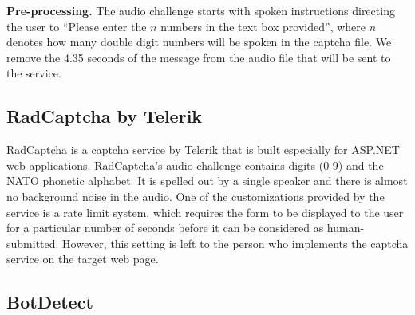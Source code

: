 
\textbf{Pre-processing.} The audio challenge starts with spoken instructions directing the user to 
``Please enter the $n$ numbers in the text box provided'', where $n$ denotes how many double digit numbers will be spoken
in the captcha file. We remove the 4.35 seconds of the message from the audio file that will be sent to the service.


\subsection{RadCaptcha by Telerik}

RadCaptcha is a captcha service by Telerik that is built especially for ASP.NET 
web applications. 
RadCaptcha's audio challenge contains digits (0-9) and the NATO phonetic alphabet. It is 
spelled out by a single speaker and there is almost no background noise in the audio. 
One of the customizations provided by the service is a rate limit system, which requires the form to 
be displayed to the user for a particular number of seconds before it can be considered as 
human-submitted. However, this setting is left to the person who implements the captcha 
service on the target web page.

\subsection{BotDetect}


